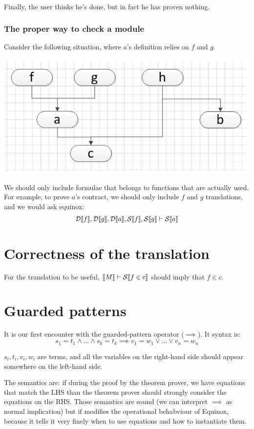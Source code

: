 \documentclass[preprint]{sigplanconf}
\begin{document}
Finally, the user thinks he's done, but in fact he has proven nothing.

\subsubsection{The proper way to check a module}
Consider the following situation, where $a$'s definition relies on $f$
and $g$.
\begin{center}
\includegraphics[scale=0.5]{flow.png}
\end{center}

We should only include formulae that belongs to functions that are
actually used. For example, to prove $a$'s contract, we should only
include $f$ and $g$ translations, and we would ask equinox:
$$ \mathcal{D} \llbracket f \rrbracket,\mathcal{D} \llbracket g \rrbracket,\mathcal{D} \llbracket a \rrbracket,\mathcal{S} \llbracket f \rrbracket,\mathcal{S} \llbracket g \rrbracket \vdash
\mathcal{S} \llbracket a \rrbracket$$


\section{Correctness of the translation}
For the translation to be useful, $\llbracket M \rrbracket \vdash \mathcal{S} \llbracket f \in c \rrbracket $
should imply that $f \in c$.



\section{Guarded patterns}
It is our first encounter with the guarded-pattern operator
($\implies$). 
It syntax is:
$$ s_1 = t_1 \land \dots \land s_k = t_k \implies v_1 = w_1 \lor \dots \lor v_n = w_n $$ 

$s_i,t_i,v_i,w_i$ are terms, and all the variables on the right-hand
side should appear somewhere on the left-hand side.

The semantics are: if during the proof by the theorem prover, we have
equations that match the LHS than the theorem prover should strongly
consider the equations on the RHS. Those semantics are sound (we can
interpret $\implies$ as normal implication) but if modifies the
operational behabviour of Equinox, because it tells it very finely
when to use equations and how to instantiate them.
\end{document}
